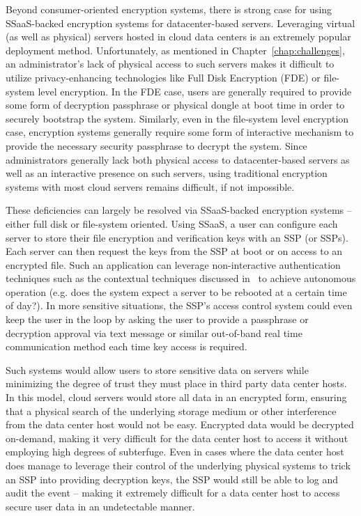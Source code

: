 Beyond consumer-oriented encryption systems, there is strong case for
using SSaaS-backed encryption systems for datacenter-based
servers. Leveraging virtual (as well as physical) servers hosted in
cloud data centers is an extremely popular deployment
method. Unfortunately, as mentioned in Chapter~\ref{chap:challenges},
an administrator's lack of physical access to such servers makes it
difficult to utilize privacy-enhancing technologies like Full Disk
Encryption (FDE) or file-system level encryption. In the FDE case,
users are generally required to provide some form of decryption
passphrase or physical dongle at boot time in order to securely
bootstrap the system. Similarly, even in the file-system level
encryption case, encryption systems generally require some form of
interactive mechanism to provide the necessary security passphrase to
decrypt the system. Since administrators generally lack both physical
access to datacenter-based servers as well as an interactive presence
on such servers, using traditional encryption systems with most cloud
servers remains difficult, if not impossible.

These deficiencies can largely be resolved via SSaaS-backed encryption
systems -- either full disk or file-system oriented. Using SSaaS, a
user can configure each server to store their file encryption and
verification keys with an SSP (or SSPs). Each server can then request
the keys from the SSP at boot or on access to an encrypted file. Such
an application can leverage non-interactive authentication techniques
such as the contextual techniques discussed in~\cite{hulsebosch2005}
to achieve autonomous operation (e.g. does the system expect a server
to be rebooted at a certain time of day?). In more sensitive
situations, the SSP's access control system could even keep the user
in the loop by asking the user to provide a passphrase or decryption
approval via text message or similar out-of-band real time
communication method each time key access is required.

Such systems would allow users to store sensitive data on servers
while minimizing the degree of trust they must place in third party
data center hosts. In this model, cloud servers would store all data
in an encrypted form, ensuring that a physical search of the
underlying storage medium or other interference from the data center
host would not be easy. Encrypted data would be decrypted on-demand,
making it very difficult for the data center host to access it without
employing high degrees of subterfuge. Even in cases where the data
center host does manage to leverage their control of the underlying
physical systems to trick an SSP into providing decryption keys, the
SSP would still be able to log and audit the event -- making it
extremely difficult for a data center host to access secure user data
in an undetectable manner.

